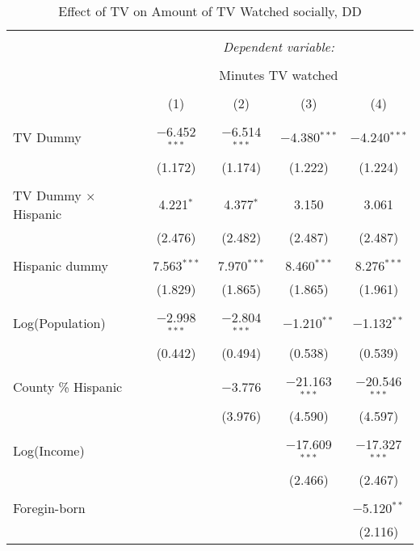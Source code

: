 
\begin{table}[!htbp] \centering 
  \caption{Effect of TV on Amount of TV Watched socially, DD} 
  \label{} 
\begin{tabular}{@{\extracolsep{-5pt}}lcccc} 
\\[-1.8ex]\hline 
\hline \\[-1.8ex] 
 & \multicolumn{4}{c}{\textit{Dependent variable:}} \\ 
\cline{2-5} 
\\[-1.8ex] & \multicolumn{4}{c}{Minutes TV watched} \\ 
\\[-1.8ex] & (1) & (2) & (3) & (4)\\ 
\hline \\[-1.8ex] 
 TV Dummy & $-$6.452$^{***}$ & $-$6.514$^{***}$ & $-$4.380$^{***}$ & $-$4.240$^{***}$ \\ 
  & (1.172) & (1.174) & (1.222) & (1.224) \\ 
  & & & & \\ 
 TV Dummy $\times$ Hispanic  & 4.221$^{*}$ & 4.377$^{*}$ & 3.150 & 3.061 \\ 
  & (2.476) & (2.482) & (2.487) & (2.487) \\ 
  & & & & \\ 
 Hispanic dummy & 7.563$^{***}$ & 7.970$^{***}$ & 8.460$^{***}$ & 8.276$^{***}$ \\ 
  & (1.829) & (1.865) & (1.865) & (1.961) \\ 
  & & & & \\ 
 Log(Population) & $-$2.998$^{***}$ & $-$2.804$^{***}$ & $-$1.210$^{**}$ & $-$1.132$^{**}$ \\ 
  & (0.442) & (0.494) & (0.538) & (0.539) \\ 
  & & & & \\ 
 County \% Hispanic &  & $-$3.776 & $-$21.163$^{***}$ & $-$20.546$^{***}$ \\ 
  &  & (3.976) & (4.590) & (4.597) \\ 
  & & & & \\ 
 Log(Income) &  &  & $-$17.609$^{***}$ & $-$17.327$^{***}$ \\ 
  &  &  & (2.466) & (2.467) \\ 
  & & & & \\ 
 Foregin-born &  &  &  & $-$5.120$^{**}$ \\ 
  &  &  &  & (2.116) \\ 

\end{tabular}
\end{table}
